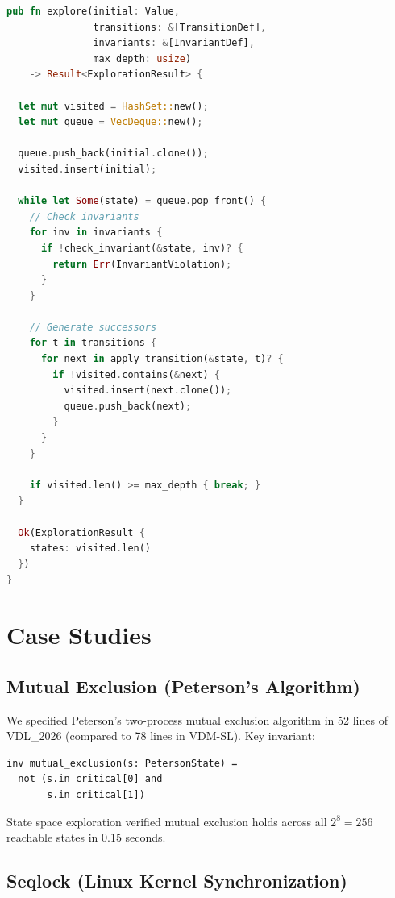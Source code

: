 \documentclass[conference]{IEEEtran}
\begin{document}
\begin{lstlisting}[language=Rust, caption={State space exploration}]
pub fn explore(initial: Value,
               transitions: &[TransitionDef],
               invariants: &[InvariantDef],
               max_depth: usize)
    -> Result<ExplorationResult> {

  let mut visited = HashSet::new();
  let mut queue = VecDeque::new();

  queue.push_back(initial.clone());
  visited.insert(initial);

  while let Some(state) = queue.pop_front() {
    // Check invariants
    for inv in invariants {
      if !check_invariant(&state, inv)? {
        return Err(InvariantViolation);
      }
    }

    // Generate successors
    for t in transitions {
      for next in apply_transition(&state, t)? {
        if !visited.contains(&next) {
          visited.insert(next.clone());
          queue.push_back(next);
        }
      }
    }

    if visited.len() >= max_depth { break; }
  }

  Ok(ExplorationResult {
    states: visited.len()
  })
}
\end{lstlisting}

\section{Case Studies}
\label{sec:evaluation}

\subsection{Mutual Exclusion (Peterson's Algorithm)}

We specified Peterson's two-process mutual exclusion algorithm in 52 lines of VDL\_2026 (compared to 78 lines in VDM-SL). Key invariant:

\begin{lstlisting}[caption={Mutual exclusion invariant}]
inv mutual_exclusion(s: PetersonState) =
  not (s.in_critical[0] and
       s.in_critical[1])
\end{lstlisting}

State space exploration verified mutual exclusion holds across all $2^8 = 256$ reachable states in 0.15 seconds.

\subsection{Seqlock (Linux Kernel Synchronization)}
\end{document}
